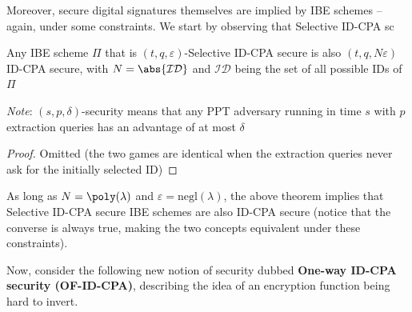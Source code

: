 \documentclass[a4paper, 12pt]{report}
\begin{document}
    Moreover, secure digital signatures themselves are implied by IBE schemes -- again, under some constraints. We start by observing that Selective ID-CPA sc

    \begin{framedthm}{}
        Any IBE scheme $\Pi$ that is $(t,q,\varepsilon)$-Selective ID-CPA secure is also $(t,q,N\varepsilon)$ ID-CPA secure, with $N = \abs{\mathcal{ID}}$ and $\mathcal{ID}$ being the set of all possible IDs of $\Pi$

        \textit{Note}: $(s,p,\delta)$-security means that any PPT adversary running in time $s$ with $p$ extraction queries has an advantage of at most $\delta$
    \end{framedthm}

    \begin{proof}
        Omitted (the two games are identical when the extraction queries never ask for the initially selected ID)
    \end{proof}

    As long as $N = \poly(\lambda)$ and $\varepsilon = \mathrm{negl}(\lambda)$, the above theorem implies that Selective ID-CPA secure IBE schemes are also ID-CPA secure (notice that the converse is always true, making the two concepts equivalent under these constraints).

    Now, consider the following new notion of security dubbed \textbf{One-way ID-CPA security (OF-ID-CPA)}, describing the idea of an encryption function being hard to invert.
\end{document}
